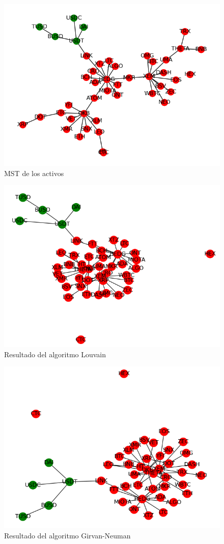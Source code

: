 \documentclass[runningheads,legalpaper,10pt]{etc/llncs}
\begin{document}
\begin{figure}[htp]
    \centering
    \includegraphics[scale=0.75]{images/mst.png}
    \caption{MST de los activos}
    \label{fig:mst}
\end{figure}

\begin{figure}[htp]
    \centering
    \includegraphics[scale=0.75]{images/community_louvain.png}
    \caption{Resultado del algoritmo Louvain}
    \label{fig:community_louvain}
\end{figure}

\begin{figure}[htp]
    \centering
    \includegraphics[scale=0.75]{images/community_gn.png}
    \caption{Resultado del algoritmo Girvan-Neuman}
    \label{fig:community_gn}
\end{figure}
\end{document}
